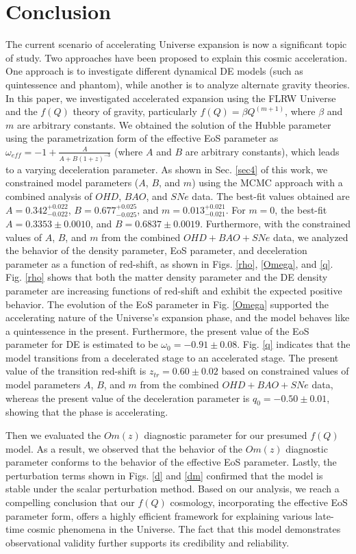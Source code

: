 \documentclass[prd,superscriptaddress,amsfonts,amssymb,amsmath,showpacs,twocolumn]{revtex4-2}
\begin{document}
\section{Conclusion}
\label{sec6}

The current scenario of accelerating Universe expansion is now a significant topic of study. Two approaches have been proposed to explain this cosmic acceleration. One approach is to investigate different dynamical DE models (such as quintessence and phantom), while another is to analyze alternate gravity theories. In this paper, we investigated accelerated expansion using the FLRW Universe and the $f(Q)$ theory of gravity, particularly $f(Q)=\beta Q^{\left( m+1\right) }$,
where $\beta$ and $m$ are arbitrary constants. We obtained the solution of the Hubble parameter using the parametrization form of the effective EoS parameter as $\omega _{eff}=-1+\frac{A}{A+B\left( 1+z\right) ^{-3}}$ (where $A$
and $B$ are arbitrary constants), which leads to a varying deceleration parameter. As shown in Sec. \ref{sec4} of this work, we constrained model parameters ($A$, $B$, and $m$) using the MCMC approach with a combined analysis of $OHD$, $BAO$, and $SNe$ data. The best-fit values obtained are $A=0.342^{+0.022}_{-0.022}$, $%
B=0.677^{+0.025}_{-0.025}$, and $m=0.013^{+0.021}_{-0.021}$. For $m=0$, the best-fit $A=0.3353\pm 0.0010$, and $B=0.6837 \pm0.0019$. Furthermore, with the constrained values of $A$, $B$, and $m$ from the
combined $OHD+BAO+SNe$ data, we analyzed the behavior of the density parameter, EoS parameter, and deceleration parameter as a function of red-shift, as shown in Figs. \ref{rho}, \ref{Omega}, and \ref{q}. Fig. \ref{rho} shows that both the matter density parameter and the DE density parameter are increasing functions of red-shift and exhibit the expected positive behavior. The evolution of the EoS parameter in Fig. \ref{Omega} supported the accelerating nature of the Universe's expansion phase, and the model behaves like a quintessence in the present. Furthermore, the present value of the EoS parameter for DE is estimated to be $\omega_{0}=-0.91 \pm 0.08$. Fig. \ref{q} indicates that the model transitions
from a decelerated stage to an accelerated stage. The present
value of the transition red-shift is $z_{tr}=0.60 \pm 0.02$ based on constrained values of model parameters $A$, $B$, and $m$ from the combined $OHD+BAO+SNe$ data, whereas the
present value of the deceleration parameter is $q_{0}=-0.50 \pm0.01$, showing that the phase is accelerating.

Then we evaluated the $Om(z)$ diagnostic parameter for our presumed $f(Q)$ model. As a result, we observed that the behavior of the $Om(z)$ diagnostic parameter conforms to the behavior of the effective EoS parameter. Lastly, the perturbation terms shown in Figs. \ref{d} and \ref{dm} confirmed that the model is stable under the scalar perturbation method. Based on our analysis, we reach a compelling conclusion that our $f(Q)$ cosmology, incorporating the effective EoS parameter form, offers a highly efficient framework for explaining various late-time cosmic phenomena in the Universe. The fact that this model demonstrates observational validity further supports its credibility and reliability. 
\end{document}
